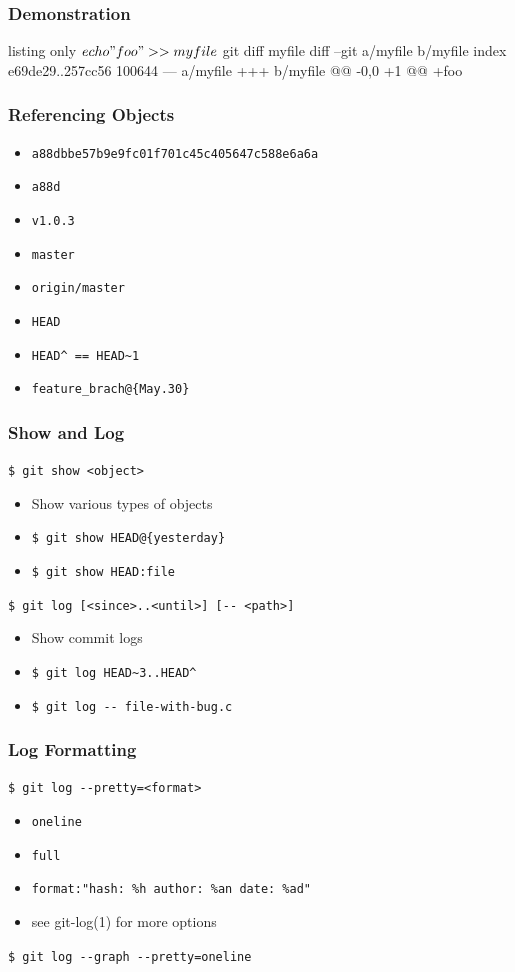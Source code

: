 \documentclass[english,compress]{beamer}
\begin{document}
\begin{frame}[fragile]
    \frametitle{Demonstration}
    \begin{tcblisting}{listing only}
$ echo "foo" >> myfile
$ git diff myfile
diff --git a/myfile b/myfile
index e69de29..257cc56 100644
--- a/myfile
+++ b/myfile
@@ -0,0 +1 @@
+foo
    \end{tcblisting}
\end{frame}

\begin{frame}[fragile]
    \frametitle{Referencing Objects}

    \begin{itemize}
        \item \verb|a88dbbe57b9e9fc01f701c45c405647c588e6a6a|
        \item \verb|a88d|
        \item \verb|v1.0.3|
        \item \verb|master|
        \item \verb|origin/master|
        \item \verb|HEAD|
        \item \verb|HEAD^ == HEAD~1|
        \item \verb|feature_brach@{May.30}|
    \end{itemize}
\end{frame}

\begin{frame}[fragile]
    \frametitle{Show and Log}

    \verb|$ git show <object>|
    \begin{itemize}
        \item Show various types of objects
        \item \verb|$ git show HEAD@{yesterday}|
        \item \verb|$ git show HEAD:file|
    \end{itemize}

    \verb|$ git log [<since>..<until>] [-- <path>]|
    \begin{itemize}
        \item Show commit logs
        \item \verb|$ git log HEAD~3..HEAD^|
        \item \verb|$ git log -- file-with-bug.c|
    \end{itemize}
\end{frame}

\begin{frame}[fragile]
    \frametitle{Log Formatting}

    \verb|$ git log --pretty=<format>|
    \begin{itemize}
        \item \verb|oneline|
        \item \verb|full|
        \item \verb|format:"hash: %h author: %an date: %ad"|
		\item see git-log(1) for more options
    \end{itemize}
	\verb|$ git log --graph --pretty=oneline|
\end{frame}
\end{document}
